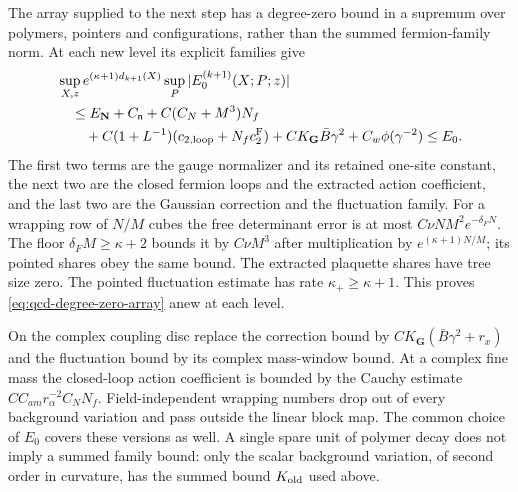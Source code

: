 \documentclass[11pt,letterpaper,reqno]{amsart}
\theoremstyle{definition}
\theoremstyle{remark}
\begin{document}
The array supplied to the next step has a
degree-zero bound in a supremum over polymers,
pointers and configurations, rather than the summed
fermion-family norm.  At each new level its explicit
families give
\begin{equation}\label{eq:qcd-degree-zero-array}
 \begin{split}
 &\sup_{X,z}e^{(\kappa+1)d_{k+1}(X)}
      \sup_P|E^{(k+1)}_0(X;P;z)|\\
 &\quad\le E_{\mathbf N}+C_{\mathsf n}
 +C(C_N+M^3)N_f\\
 &\qquad+C(1+L^{-1})(c_{2,\mathrm{loop}}+N_fc_2^{\rm F})
 +CK_{\mathbf G}\bar B\gamma^2
 +C_w\phi(\gamma^{-2})\le E_0 .
 \end{split}
\end{equation}
The first two terms are the gauge normalizer and its
retained one-site constant, the next two are the
closed fermion loops and the extracted action
coefficient, and the last two are the Gaussian
correction and the fluctuation family.
For a wrapping row of $N/M$ cubes the free determinant
error is at most $C\nu NM^2e^{-\delta_FN}$.
The floor $\delta_FM\ge\kappa+2$ bounds it by
$C\nu M^3$ after multiplication by
$e^{(\kappa+1)N/M}$; its pointed shares obey the
same bound.  The extracted plaquette shares have
tree size zero.  The pointed fluctuation estimate
has rate $\kappa_+\ge\kappa+1$.
This proves \eqref{eq:qcd-degree-zero-array} anew
at each level.

On the complex coupling disc replace the correction
bound by $CK_{\mathbf G}(\bar B\gamma^2+r_x)$ and
the fluctuation bound by its complex mass-window
bound.  At a complex fine mass the closed-loop
action coefficient is bounded by the Cauchy estimate
$C C_{am}r_\alpha^{-2}C_NN_f$.
Field-independent wrapping numbers drop out of every
background variation and pass outside the linear
block map.  The common choice of $E_0$ covers these
versions as well.  A single spare unit of polymer
decay does not imply a summed family bound: only
the scalar background variation, of second order
in curvature, has the summed bound $K_{\rm old}$
used above.
\end{document}
